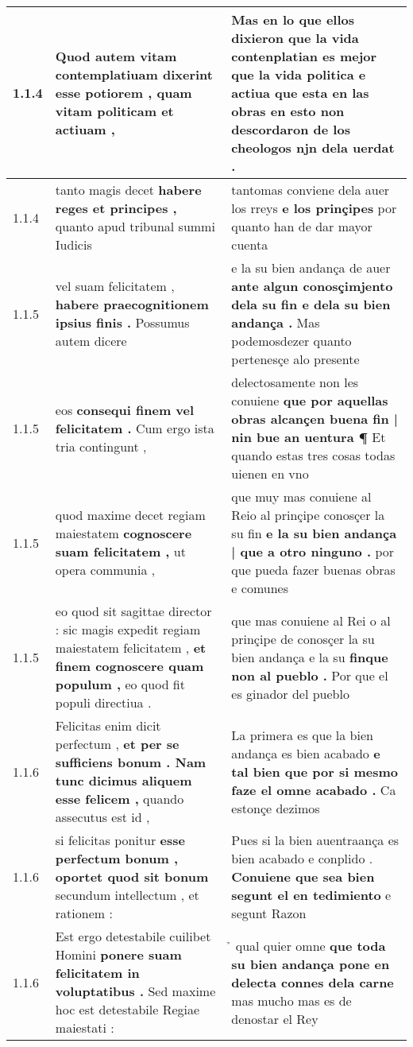 \begin{tabular}{|p{1cm}|p{6.5cm}|p{6.5cm}|}
1.1.4 & Quod autem vitam contemplatiuam dixerint \textbf{ esse potiorem , } quam vitam politicam et actiuam , & Mas en lo que ellos dixieron \textbf{ que la vida contenplatian es mejor que la vida politica e actiua } que esta en las obras en esto non descordaron de los cheologos njn dela uerdat . \\\hline
1.1.4 & tanto magis decet \textbf{ habere reges et principes , } quanto apud tribunal summi Iudicis & tantomas conviene dela auer los rreys \textbf{ e los prinçipes } por quanto han de dar mayor cuenta \\\hline
1.1.5 & vel suam felicitatem , \textbf{ habere praecognitionem ipsius finis . } Possumus autem dicere & e la su bien andança de auer \textbf{ ante algun conosçimjento dela su fin e dela su bien andança . } Mas podemosdezer quanto pertenesçe alo presente \\\hline
1.1.5 & eos \textbf{ consequi finem vel felicitatem . } Cum ergo ista tria contingunt , & delectosamente non les conuiene \textbf{ que por aquellas obras alcançen buena fin | nin bue an uentura ¶ } Et quando estas tres cosas todas uienen en vno \\\hline
1.1.5 & quod maxime decet regiam maiestatem \textbf{ cognoscere suam felicitatem , } ut opera communia , & que muy mas conuiene al Reio al prinçipe conosçer la su fin \textbf{ e la su bien andança | que a otro ninguno . } por que pueda fazer buenas obras e comunes \\\hline
1.1.5 & eo quod sit sagittae director : sic magis expedit regiam maiestatem felicitatem , \textbf{ et finem cognoscere quam populum , } eo quod fit populi directiua . & que mas conuiene al Rei o al prinçipe de conosçer la su bien andança e la su \textbf{ finque non al pueblo . } Por que el es ginador del pueblo \\\hline
1.1.6 & Felicitas enim dicit perfectum , \textbf{ et per se sufficiens bonum . Nam tunc dicimus aliquem esse felicem , } quando assecutus est id , & La primera es que la bien andança es bien acabado \textbf{ e tal bien que por si mesmo faze el omne acabado . } Ca estonçe dezimos \\\hline
1.1.6 & si felicitas ponitur \textbf{ esse perfectum bonum , oportet quod sit bonum } secundum intellectum , et rationem : & Pues si la bien auentraança es bien acabado e conplido . \textbf{ Conuiene que sea bien segunt el en tedimiento } e segunt Razon \\\hline
1.1.6 & Est ergo detestabile cuilibet Homini \textbf{ ponere suam felicitatem in voluptatibus . } Sed maxime hoc est detestabile Regiae maiestati : & ̉ qual quier omne \textbf{ que toda su bien andança pone en delecta connes dela carne } mas mucho mas es de denostar el Rey \\\hline

\end{tabular}
